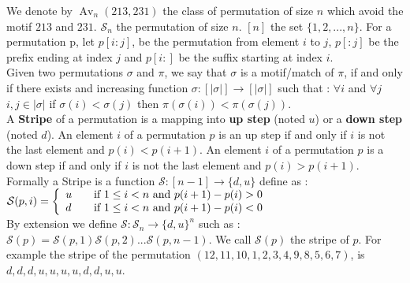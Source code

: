 \documentclass[12pt, a4paper]{article}
\DeclareMathOperator{\Avd}{Av}
\newcommand\Av[2]{\Avd_{{#1}}({#2})}
\newcommand{\Perm}[1]{\mathcal{S}_{#1}}
\newcommand{\ptext}{\pi}
\newcommand{\pmotif}{\sigma}
\newcounter{num}
\newcommand{\num}{\stepcounter{num} }
\newcommand{\dstep}{d}
\newcommand{\ustep}{u}
\begin{document}
		We denote by $\Av{n}{213,231}$ the class
		of permutation of size $n$ which avoid 
		the motif $213$ and $231$. 
		$\Perm{n}$ the permutation of size $n$.
		$[n]$ the set $\{1,2,...,n\}.$
		For a permutation p, let $p[i:j]$, 
		be the permutation from element $i$ to $j$,
		$p[:j]$ be the prefix ending at index $j$
		and $p[i:]$ be the suffix starting at index $i$.\\
		
		Given two permutations
		$\pmotif$ and $\ptext$,
		we say that $\pmotif$
		is a motif/match of
		$\ptext$,
		if and only if
		there exists 
		and increasing function 
		$\sigma:[|\pmotif|] \rightarrow [|\pmotif|]$
		such that : $\forall i$ and 
		$\forall j$ $i,j \in |\pmotif| $
		if $\pmotif(i)<\pmotif(j)$
		then $\ptext(\sigma(i))<\ptext(\sigma(j))$.\\
		
		
		A \textbf{Stripe} of a permutation
		is a mapping into \textbf{up step} (noted $\ustep$) 
		or a \textbf{down step} (noted $\dstep$).
		An element $i$ of a permutation $p$ is an up step if and only if $i$ is not the last element and $p(i)<p(i+1)$.
		An element $i$ of a permutation $p$ is a down step if and only if $i$ is not the last element and $p(i)>p(i+1)$.\\	
		Formally a Stripe is a function $\mathcal{S} : [n-1] \to \{\dstep,\ustep\}$ define as :\\
		$ \mathcal{S}(p,i) = \left\{ 
		  \begin{array}{l l}
		    \ustep & \quad \text{if $1 \leq i<n$ and $p(i+1)-p(i)>0$ }\\
		    \dstep & \quad \text{if $1 \leq i<n$ and $p(i+1)-p(i)<0$ }\\
		  \end{array} \right. $\\
		  
		By extension we define  $\mathcal{S} : \Perm{n} \to \{\dstep,\ustep\}^{n}$ such as :
		$\mathcal{S}(p)=\mathcal{S}(p,1)\mathcal{S}(p,2)...\mathcal{S}(p,n-1)$.
		We call $\mathcal{S}(p)$ the stripe of $p$.
		For example the stripe of the permutation $(12,11,10,1,2,3,4,9,8,5,6,7)$, 
		is $\dstep,\dstep,\dstep,\ustep,\ustep,\ustep,\ustep,\dstep,\dstep,\ustep,\ustep$.\\
		  
	  			 		  	
\end{document}

